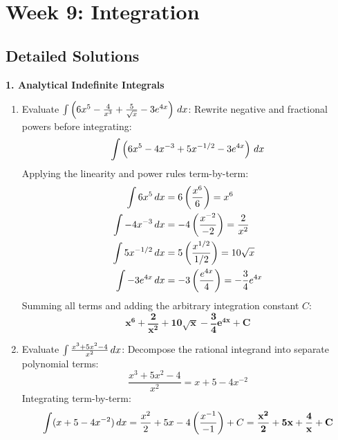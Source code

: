 \section*{Week 9: Integration}

\subsection*{Detailed Solutions}

\textbf{1. Analytical Indefinite Integrals}
\begin{enumerate}
    \item Evaluate $\int \left( 6x^5 - \frac{4}{x^3} + \frac{5}{\sqrt{x}} - 3e^{4x} \right) \,dx$:
    Rewrite negative and fractional powers before integrating:
    \begin{equation*}
    \int \left( 6x^5 - 4x^{-3} + 5x^{-1/2} - 3e^{4x} \right) \,dx
    \end{equation*}
    Applying the linearity and power rules term-by-term:
    \begin{align*}
    \int 6x^5 \,dx &= 6 \left(\frac{x^6}{6}\right) = x^6 \\
    \int -4x^{-3} \,dx &= -4 \left(\frac{x^{-2}}{-2}\right) = \frac{2}{x^2} \\
    \int 5x^{-1/2} \,dx &= 5 \left(\frac{x^{1/2}}{1/2}\right) = 10\sqrt{x} \\
    \int -3e^{4x} \,dx &= -3 \left(\frac{e^{4x}}{4}\right) = -\frac{3}{4}e^{4x}
    \end{align*}
    Summing all terms and adding the arbitrary integration constant $C$:
    \begin{equation*}
    \mathbf{x^6 + \frac{2}{x^2} + 10\sqrt{x} - \frac{3}{4}e^{4x} + C}
    \end{equation*}

    \item Evaluate $\int \frac{x^3 + 5x^2 - 4}{x^2} \,dx$:
    Decompose the rational integrand into separate polynomial terms:
    \begin{equation*}
    \frac{x^3 + 5x^2 - 4}{x^2} = x + 5 - 4x^{-2}
    \end{equation*}
    Integrating term-by-term:
    \begin{equation*}
    \int (x + 5 - 4x^{-2}) \,dx = \frac{x^2}{2} + 5x - 4\left(\frac{x^{-1}}{-1}\right) + C = \mathbf{\frac{x^2}{2} + 5x + \frac{4}{x} + C}
    \end{equation*}
\end{enumerate}

